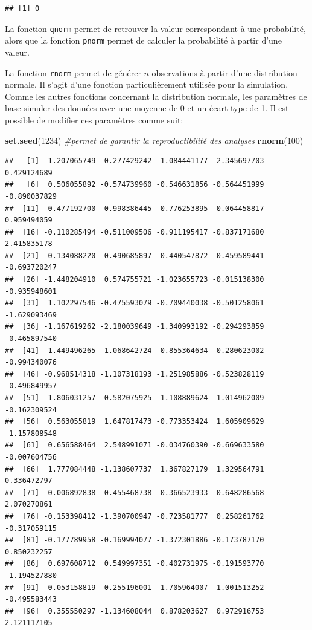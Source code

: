 \documentclass[
]{book}
\newenvironment{Shaded}{\begin{snugshade}}{\end{snugshade}}
\newcommand{\CommentTok}[1]{\textcolor[rgb]{0.56,0.35,0.01}{\textit{#1}}}
\newcommand{\DecValTok}[1]{\textcolor[rgb]{0.00,0.00,0.81}{#1}}
\newcommand{\FunctionTok}[1]{\textcolor[rgb]{0.13,0.29,0.53}{\textbf{#1}}}
\newcommand{\NormalTok}[1]{#1}
\begin{document}
\begin{verbatim}
## [1] 0
\end{verbatim}

La fonction \texttt{qnorm} permet de retrouver la valeur correspondant à une probabilité, alors que la fonction \texttt{pnorm} permet de calculer la probabilité à partir d'une valeur.

La fonction \texttt{rnorm} permet de générer \(n\) observations à partir d'une distribution normale. Il s'agit d'une fonction particulièrement utilisée pour la simulation. Comme les autres fonctions concernant la distribution normale, les paramètres de base simuler des données avec une moyenne de 0 et un écart-type de 1. Il est possible de modifier ces paramètres comme suit:

\begin{Shaded}
\begin{Highlighting}[]
\FunctionTok{set.seed}\NormalTok{(}\DecValTok{1234}\NormalTok{) }\CommentTok{\#permet de garantir la reproductibilité des analyses }
\FunctionTok{rnorm}\NormalTok{(}\DecValTok{100}\NormalTok{) }
\end{Highlighting}
\end{Shaded}

\begin{verbatim}
##   [1] -1.207065749  0.277429242  1.084441177 -2.345697703  0.429124689
##   [6]  0.506055892 -0.574739960 -0.546631856 -0.564451999 -0.890037829
##  [11] -0.477192700 -0.998386445 -0.776253895  0.064458817  0.959494059
##  [16] -0.110285494 -0.511009506 -0.911195417 -0.837171680  2.415835178
##  [21]  0.134088220 -0.490685897 -0.440547872  0.459589441 -0.693720247
##  [26] -1.448204910  0.574755721 -1.023655723 -0.015138300 -0.935948601
##  [31]  1.102297546 -0.475593079 -0.709440038 -0.501258061 -1.629093469
##  [36] -1.167619262 -2.180039649 -1.340993192 -0.294293859 -0.465897540
##  [41]  1.449496265 -1.068642724 -0.855364634 -0.280623002 -0.994340076
##  [46] -0.968514318 -1.107318193 -1.251985886 -0.523828119 -0.496849957
##  [51] -1.806031257 -0.582075925 -1.108889624 -1.014962009 -0.162309524
##  [56]  0.563055819  1.647817473 -0.773353424  1.605909629 -1.157808548
##  [61]  0.656588464  2.548991071 -0.034760390 -0.669633580 -0.007604756
##  [66]  1.777084448 -1.138607737  1.367827179  1.329564791  0.336472797
##  [71]  0.006892838 -0.455468738 -0.366523933  0.648286568  2.070270861
##  [76] -0.153398412 -1.390700947 -0.723581777  0.258261762 -0.317059115
##  [81] -0.177789958 -0.169994077 -1.372301886 -0.173787170  0.850232257
##  [86]  0.697608712  0.549997351 -0.402731975 -0.191593770 -1.194527880
##  [91] -0.053158819  0.255196001  1.705964007  1.001513252 -0.495583443
##  [96]  0.355550297 -1.134608044  0.878203627  0.972916753  2.121117105
\end{verbatim}
\end{document}
